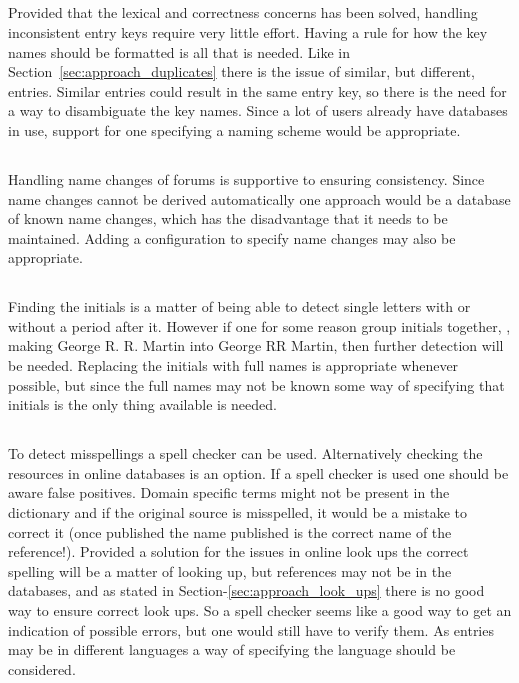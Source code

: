\subsection{}

Provided that the lexical and correctness concerns has been solved,
handling inconsistent entry keys require very little effort.  Having a
rule for how the key names should be formatted is all that is needed.
Like in Section~\ref{sec:approach_duplicates} there is the issue of
similar, but different, entries.  Similar entries could result in the
same entry key, so there is the need for a way to disambiguate the key
names.  Since a lot of users already have databases in use, support
for one specifying a naming scheme would be appropriate.


\subsection{}

Handling name changes of forums is supportive to ensuring consistency.
Since name changes cannot be derived automatically one approach would
be a database of known name changes, which has the disadvantage that
it needs to be maintained.  Adding a configuration to specify name
changes may also be appropriate.


\subsection{}

Finding the initials is a matter of being able to detect single
letters with or without a period after it.  However if one for some
reason group initials together, \eg, making George R. R. Martin into
George RR Martin, then further detection will be needed.  Replacing
the initials with full names is appropriate whenever possible, but
since the full names may not be known some way of specifying that
initials is the only thing available is needed.


\subsection{}

To detect misspellings a spell checker can be used.  Alternatively
checking the resources in online databases is an option.  If a spell
checker is used one should be aware false positives.  Domain specific
terms might not be present in the dictionary and if the original
source is misspelled, it would be a mistake to correct it (once
published the name published is the correct name of the reference!).
Provided a solution for the issues in online look ups the correct
spelling will be a matter of looking up, but references may not be in
the databases, and as stated in Section-\ref{sec:approach_look_ups}
there is no good way to ensure correct look ups.  So a spell checker
seems like a good way to get an indication of possible errors, but one
would still have to verify them.  As entries may be in different
languages a way of specifying the language should be considered.


